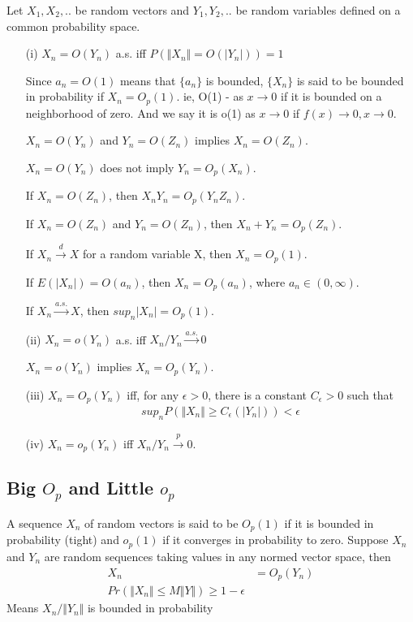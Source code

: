 \begin{Definition}
Let $X_1, X_2,..$ be random vectors and $Y_1, Y_2,..$ be random variables defined on a common probability space.

\begin{itemize}
\item[(i)] $X_n = O(Y_n)$ a.s. iff $P(\Vert  X_n\Vert = O(|Y_n|)) = 1$

Since $a_n = O(1)$ means that $\{ a_n \}$ is bounded, $\{ X_n\}$ is said to be bounded in probability if $X_n = O_p(1)$. 
ie, O(1) - as $x \rightarrow 0$ if it is bounded on a neighborhood of zero. And we say it is o(1) as $x \rightarrow 0$ if $f(x) \rightarrow 0, x \rightarrow 0$.

$X_n = O(Y_n)$ and $Y_n = O(Z_n)$ implies $X_n = O(Z_n)$.

$X_n = O(Y_n)$ does not imply $Y_n = O_p(X_n)$.

If $X_n = O(Z_n)$, then $X_nY_n = O_p(Y_n Z_n)$.

If $X_n = O(Z_n)$ and $Y_n = O(Z_n)$, then $X_n + Y_n = O_p(Z_n)$.

If $X_n \xrightarrow {d} X$ for a random variable X, then $X_n = O_p(1)$.

If $E(|X_n|) = O(a_n)$, then $X_n = O_p(a_n)$, where $a_n \in (0, \infty)$.

If $X_n \xrightarrow {a.s.} X$, then $sup_n|X_n| = O_p(1)$.

\item[(ii)] $X_n = o(Y_n)$ a.s. iff $ X_n/Y_n \xrightarrow {a.s.} 0$

$X_n = o(Y_n)$ implies $X_n = O_p(Y_n)$.

\item[(iii)] $X_n = O_p(Y_n)$ iff, for any $\epsilon > 0$, there is a constant $C_{\epsilon} > 0$ such that 
 \begin{align*}
   sup_n P(\Vert  X_n\Vert \geq C_{\epsilon}(|Y_n|)) < \epsilon
\end{align*}

\item[(iv)] $X_n = o_p(Y_n)$ iff $X_n/Y_n \xrightarrow {p} 0$.


\end{itemize}
\end{Definition}


\subsection{Big $O_p$ and Little $o_p$}
A sequence $X_n$ of random vectors is said to be $O_p(1)$ if it is bounded in probability (tight) and $o_p(1)$ if it converges in probability to zero.
Suppose $X_n$ and $Y_n$ are random sequences taking values in any normed vector space, then
\begin{align*}
	X_n &= O_p(Y_n) \\
	Pr(\Vert X_n \Vert \leq M \Vert Y \Vert) \geq 1 - \epsilon
\end{align*}
Means $X_n/ \Vert Y_n \Vert $ is bounded in probability 


